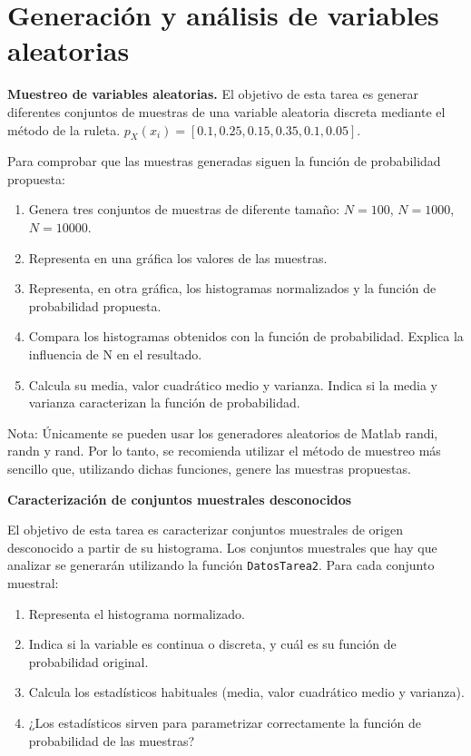 \documentclass[10pt,twoside,spanish,a4paper]{article}
\begin{document}
\section*{Generación y análisis de variables aleatorias}
	\begin{itemize}
		\itemP  \textbf{Muestreo de variables aleatorias.}
			El objetivo de esta tarea es generar diferentes conjuntos de muestras de una variable aleatoria discreta mediante el método de la ruleta.
			\itemR $p_X(x_i)=[0.1,0.25,0.15,0.35,0.1,0.05]$.
			
			Para comprobar que las muestras generadas siguen la función de probabilidad propuesta:		
			\begin{enumerate}[label=\alph*)]
				\item Genera tres conjuntos de muestras de diferente tamaño: $N=100$, $N=1000$, $N=10000$.
				\item Representa en una gráfica los valores de las muestras.
				\item Representa, en otra gráfica, los histogramas normalizados y la función de probabilidad propuesta.
				\item Compara los histogramas obtenidos con la función de probabilidad. Explica la influencia de N en el resultado.
				\item Calcula su media, valor cuadrático medio y varianza. Indica si la media y varianza caracterizan la función de probabilidad. 
			\end{enumerate}

			\hspace{0.2cm}\color{blue}Nota: \color{black} \'{U}nicamente se pueden usar los generadores aleatorios de Matlab  \color{blue}randi\color{black}, \color{blue}randn \color{black} y \color{blue}rand\color{black}.  Por lo tanto, se recomienda utilizar el método de muestreo más sencillo que, utilizando dichas funciones, genere las muestras propuestas.

		\itemP \textbf{Caracterización de conjuntos muestrales desconocidos}

			El objetivo de esta tarea es caracterizar conjuntos muestrales de origen desconocido a partir de su histograma.
			Los conjuntos muestrales que hay que analizar se generarán utilizando la función \color{blue}\texttt{DatosTarea2}\color{black}. Para cada conjunto muestral:
			\begin{enumerate}[label=\alph*)]
				\item Representa el histograma normalizado.
				\item Indica si la variable es continua o discreta, y cuál es su función de probabilidad original.
				\item Calcula los estadísticos habituales (media, valor cuadrático medio y varianza).
				\item ¿Los estadísticos sirven para parametrizar correctamente la función de probabilidad de las muestras?
			\end{enumerate}

	\end{itemize}
\end{document}
